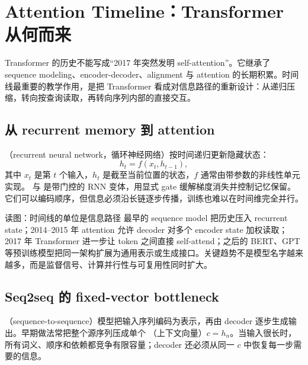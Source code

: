 \section{Attention Timeline：Transformer 从何而来}

Transformer 的历史不能写成“2017 年突然发明 self-attention”。它继承了 sequence modeling、encoder-decoder、alignment 与 attention 的长期积累。时间线最重要的教学作用，是把 Transformer 看成对信息路径的重新设计：从递归压缩，转向按查询读取，再转向序列内部的直接交互。

\subsection{从 recurrent memory 到 attention}

（recurrent neural network，循环神经网络）按时间递归更新隐藏状态：
\[
h_t = f(x_t,h_{t-1}),
\]
其中 $x_t$ 是第 $t$ 个输入，$h_t$ 是截至当前位置的状态，$f$ 通常由带参数的非线性单元实现。 与  是带门控的 RNN 变体，用显式 gate 缓解梯度消失并控制记忆保留。它们可以编码顺序，但信息必须沿长链逐步传播，训练也难以在时间维完全并行。


\begin{knowledgebox}{读图：时间线的单位是信息路径}
最早的 sequence model 把历史压入 recurrent state；2014--2015 年 attention 允许 decoder 对多个 encoder state 加权读取；2017 年 Transformer 进一步让 token 之间直接 self-attend；之后的 BERT、GPT 等预训练模型把同一架构扩展为通用表示或生成接口。关键趋势不是模型名字越来越多，而是监督信号、计算并行性与可复用性同时扩大。
\end{knowledgebox}


\subsection{Seq2seq 的 fixed-vector bottleneck}

（sequence-to-sequence）模型把输入序列编码为表示，再由 decoder 逐步生成输出。早期做法常把整个源序列压成单个 （上下文向量）$c=h_n$。当输入很长时，所有词义、顺序和依赖都竞争有限容量；decoder 还必须从同一 $c$ 中恢复每一步需要的信息。

